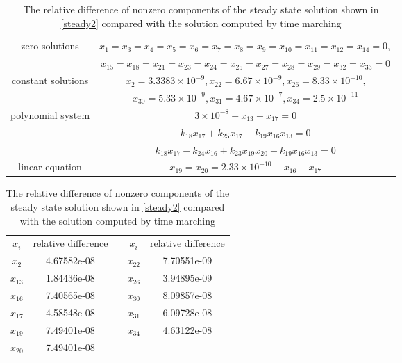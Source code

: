 \begin{table}
\begin{center}
\caption{Steady state solution by setting free variables be zeros in
Table \ref{steady}} \label{steady2}\vspace{3mm}
\begin{tabular}{|c|c|}\hline
zero solutions&$x_1=x_3=x_4=x_5=x_6=x_7=x_8=x_9=x_{10}=x_{11}=x_{12}= x_{14}=0,$\\
&
$x_{15}=x_{18}=x_{21}=x_{23}=x_{24}=x_{25}=x_{27}=x_{28}=x_{29}=x_{32}=x_{33}=0$\\\hline
constant solutions&$x_{2}=3.3383\times10^{-9},
x_{22}=6.67\times10^{-9},
x_{26}=8.33\times10^{-10}$,\\
&$x_{30}=5.33\times
10^{-9},x_{31}=4.67\times10^{-7},x_{34}=2.5\times 10^{-11}$\\\hline
polynomial system &$
3\times10^{-8}-x_{13}-x_{17}=0$\\
&$k_{18}x_{17}+k_{25}x_{17}-k_{19}x_{16}x_{13}=0$\\&$k_{18}x_{17}-k_{24}x_{16}+k_{23}x_{19}x_{20}-k_{19}x_{16}x_{13}=0$\\\hline
linear
equation&$x_{19}=x_{20}=2.33\times10^{-10}-x_{16}-x_{17}$\\\hline
\end{tabular}
\caption{The relative difference of nonzero components of the steady
state solution shown in \ref{steady2} compared with the solution
computed by time marching } \label{RE}\vspace{3mm}
\begin{tabular}{|c|c|c|c|c|}\cline{1-2}
\cline{4-5} $x_i$&relative difference&&$x_i$&relative difference \\
\cline{1-2} \cline{4-5} $x_2$& 4.67582e-08&&$x_{22}$ &
7.70551e-09\\\cline{1-2} \cline{4-5}
 $x_{13}$& 1.84436e-08&&$x_{26}$
& 3.94895e-09\\\cline{1-2} \cline{4-5}
  $x_{16}$&    7.40565e-08&&$x_{30}$ & 8.09857e-08\\\cline{1-2} \cline{4-5}
  $x_{17}$&    4.58548e-08&&$x_{31}$ & 6.09728e-08\\\cline{1-2} \cline{4-5}
  $x_{19}$&     7.49401e-08&&$x_{34}$ & 4.63122e-08\\\cline{1-2} \cline{4-5}
  $x_{20}$&    7.49401e-08&&&\\\cline{1-2} \cline{4-5}
\end{tabular}
\end{center}
\end{table}

